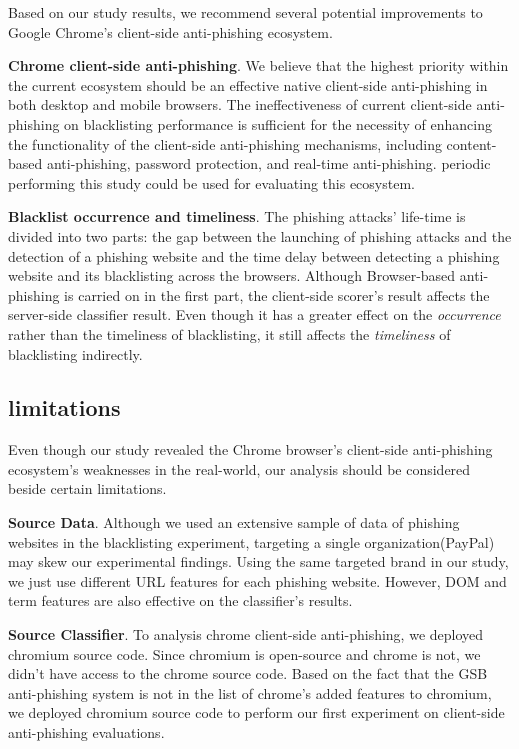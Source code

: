 \documentclass[letterpaper,twocolumn,10pt]{article}
\begin{document}
Based on our study results, we recommend several potential improvements to Google Chrome's client-side anti-phishing ecosystem.

\textbf{Chrome client-side anti-phishing}. We believe that the highest priority within the current ecosystem should be an effective native client-side anti-phishing in both desktop and mobile browsers. The ineffectiveness of current client-side anti-phishing on blacklisting performance is sufficient for the necessity of enhancing the functionality of the client-side anti-phishing mechanisms, including content-based anti-phishing, password protection, and real-time anti-phishing. periodic performing this study could be used for evaluating this ecosystem.

\textbf{Blacklist occurrence and timeliness}. The phishing attacks' life-time is divided into two parts: the gap between the launching of phishing attacks and the detection of a phishing website and the time delay between detecting a phishing website and its blacklisting across the browsers.
Although Browser-based anti-phishing is carried on in the first part, the client-side scorer's result affects the server-side classifier result. Even though it has a greater effect on the \textit{occurrence} rather than the timeliness of blacklisting, it still affects the \textit{timeliness} of blacklisting indirectly. 

\subsection{limitations}
Even though our study revealed the Chrome browser's client-side anti-phishing ecosystem's weaknesses in the real-world, our analysis should be considered beside certain limitations.

\textbf{Source Data}. Although we used an extensive sample of data of phishing websites in the blacklisting experiment, targeting a single organization(PayPal) may skew our experimental findings. 
Using the same targeted brand in our study, we just use different URL features for each phishing website. However, DOM and term features are also effective on the classifier's results. 

\textbf{Source Classifier}. To analysis chrome client-side anti-phishing, we deployed chromium source code. Since chromium is open-source and chrome is not, we didn't have access to the chrome source code. Based on the fact that the GSB anti-phishing system is not in the list of chrome's added features to chromium, we deployed chromium source code to perform our first experiment on client-side anti-phishing evaluations. 
\end{document}
